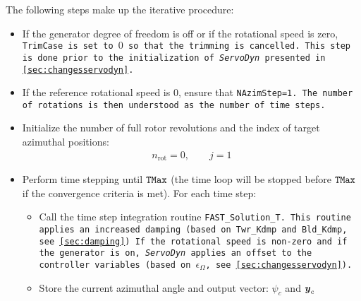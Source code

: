 \documentclass[11pt]{article}
\begin{document}
The following steps make up the iterative procedure:
\begin{itemize}\tightlist

    \item If the generator degree of freedom is off or if the rotational speed is zero, \tt{TrimCase} is set to $0$ so that the trimming is cancelled. This step is done prior to the initialization of \textit{ServoDyn} presented in \autoref{sec:changesservodyn}.
    \item If the reference rotational speed is $0$, ensure that \tt{NAzimStep}=1. The number of rotations is then understood as the number of time steps.
    \item Initialize the number of full rotor revolutions and the index of target azimuthal positions:
        \begin{align}
            n_\text{rot} = 0
         , \qquad
         j = 1
        \end{align}
    \item Perform time stepping until $\tt{TMax}$ (the time loop will be stopped before $\tt{TMax}$ if the convergence criteria is met).
      For each time step:
        \begin{itemize}\tightlist
            \item Call the time step integration routine \tt{FAST\_Solution\_T}. This routine applies an increased damping (based on \tt{Twr\_Kdmp} and \tt{Bld\_Kdmp}, see \autoref{sec:damping})
   If the rotational speed is non-zero and if the generator is on, \textit{ServoDyn} applies an offset to the controller variables (based on $\epsilon_\Omega$, see \autoref{sec:changesservodyn}).
            \item Store the current azimuthal angle and output vector: $\psi_{c}$ and $\v{y}_c$

\end{itemize}
\end{itemize}
\end{document}
